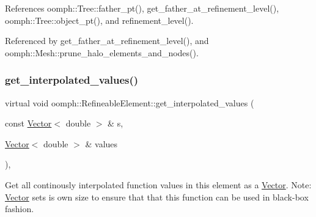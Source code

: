 References oomph\+::\+Tree\+::father\+\_\+pt(), get\+\_\+father\+\_\+at\+\_\+refinement\+\_\+level(), oomph\+::\+Tree\+::object\+\_\+pt(), and refinement\+\_\+level().



Referenced by get\+\_\+father\+\_\+at\+\_\+refinement\+\_\+level(), and oomph\+::\+Mesh\+::prune\+\_\+halo\+\_\+elements\+\_\+and\+\_\+nodes().

\mbox{\label{classoomph_1_1RefineableElement_ad9a4f92880668a2373326d8306365c43}} 
\subsubsection{\texorpdfstring{get\+\_\+interpolated\+\_\+values()}{get\_interpolated\_values()}\hspace{0.1cm}{\footnotesize\ttfamily [1/2]}}
{\footnotesize\ttfamily virtual void oomph\+::\+Refineable\+Element\+::get\+\_\+interpolated\+\_\+values (\begin{DoxyParamCaption}\item[{const \hyperlink{classoomph_1_1Vector}{Vector}$<$ double $>$ \&}]{s,  }\item[{\hyperlink{classoomph_1_1Vector}{Vector}$<$ double $>$ \&}]{values }\end{DoxyParamCaption})\hspace{0.3cm}{\ttfamily [inline]}, {\ttfamily [virtual]}}



Get all continously interpolated function values in this element as a \hyperlink{classoomph_1_1Vector}{Vector}. Note\+: \hyperlink{classoomph_1_1Vector}{Vector} sets is own size to ensure that that this function can be used in black-\/box fashion. 




